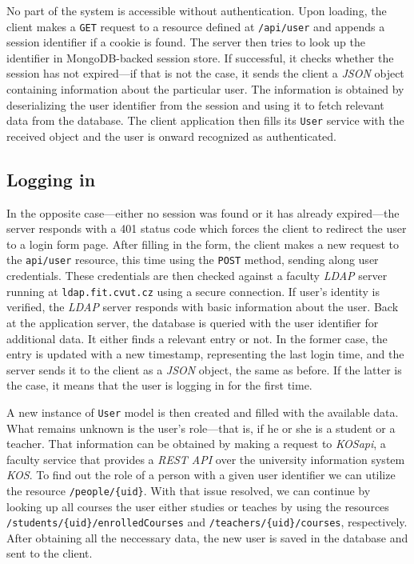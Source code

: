 \documentclass[thesis=M,english,hidelinks]{FITthesis}[2012/10/20]
\newcommand{\code}{\texttt}
\begin{document}
No part of the system is accessible without authentication. Upon loading, the client makes a \code{GET} request to a resource defined at \code{/api/user} and appends a session identifier if a cookie is found. The server then tries to look up the identifier in MongoDB-backed session store. If successful, it checks whether the session has not expired---if that is not the case, it sends the client a \textit{JSON} object containing information about the particular user. The information is obtained by deserializing the user identifier from the session and using it to fetch relevant data from the database. The client application then fills its \code{User} service with the received object and the user is onward recognized as authenticated.

\subsection{Logging in}

In the opposite case---either no session was found or it has already expired---the server responds with a 401 status code which forces the client to redirect the user to a login form page. After filling in the form, the client makes a new request to the \code{api/user} resource, this time using the \code{POST} method, sending along user credentials. These credentials are then checked against a faculty \textit{LDAP} server running at \code{ldap.fit.cvut.cz} using a secure connection. If user's identity is verified, the \textit{LDAP} server responds with basic information about the user. Back at the application server, the database is queried with the user identifier for additional data. It either finds a relevant entry or not. In the former case, the entry is updated with a new timestamp, representing the last login time, and the server sends it to the client as a \textit{JSON} object, the same as before. If the latter is the case, it means that the user is logging in for the first time.

A new instance of \code{User} model is then created and filled with the available data. What remains unknown is the user's role---that is, if he or she is a student or a teacher. That information can be obtained by making a request to \textit{KOSapi}, a faculty service that provides a \textit{REST API} over the university information system \textit{KOS}. To find out the role of a person with a given user identifier we can utilize the resource \code{/people/\{uid\}}. With that issue resolved, we can continue by looking up all courses the user either studies or teaches by using the resources \code{/students/\{uid\}/enrolledCourses} and \code{/teachers/\{uid\}/courses}, respectively. After obtaining all the neccessary data, the new user is saved in the database and sent to the client.
\end{document}
